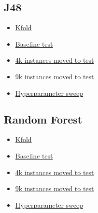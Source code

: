 \documentclass[11pt]{article}
\begin{document}
\subsection{J48}
\begin{itemize}
  \item \href{https://wandb.ai/supervisedlearning/J48%20all%20Kfolds/?workspace=user-jimmym620}{Kfold}
  \item \href{https://wandb.ai/supervisedlearning/J48%20all%20test%20set%20experiments?workspace=user-dardric}{Baseline test}
  \item \href{https://wandb.ai/supervisedlearning/J48%20all%204000%20moved%20to%20test%20experiments?workspace=user-dardric}{4k instances moved to test}
  \item \href{https://wandb.ai/supervisedlearning/J48%20all%209000%20moved%20to%20test%20experiments?workspace=user-dardric}{9k instances moved to test}
  \item \href{https://wandb.ai/supervisedlearning/J48-sweeps/sweeps/iujbgua2?workspace=user-dardric}{Hyperparameter sweep}
\end{itemize}

\subsection{Random Forest}
\begin{itemize}
  \item \href{https://wandb.ai/supervisedlearning/RF%20all%20Kfolds?workspace=user-jimmym620}{Kfold}
  \item \href{https://wandb.ai/supervisedlearning/RF%20all%20test%20set%20experiments?workspace=user-jimmym620}{Baseline test}
  \item \href{https://wandb.ai/supervisedlearning/RF%20all%204000%20moved%20to%20test%20experiments?workspace=user-jimmym620}{4k instances moved to test}
  \item \href{https://wandb.ai/supervisedlearning/RF%20all%209000%20moved%20to%20test%20experiments?workspace=user-jimmym620}{9k instances moved to test}
  \item \href{https://wandb.ai/supervisedlearning/RF-sweeps/sweeps/eh36kpyc?workspace=user-jimmym620}{Hyperparameter sweep}
\end{itemize}
\end{document}
